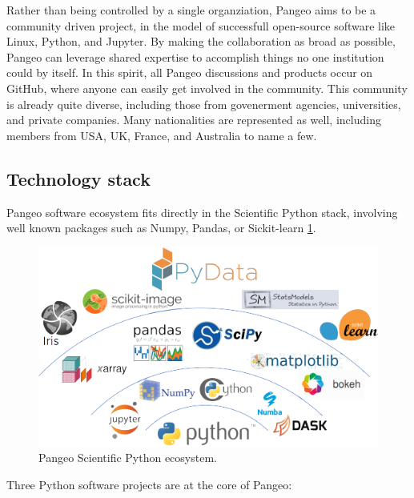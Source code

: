 \documentclass{article}
\begin{document}
Rather than being controlled by a single organziation, Pangeo aims to be a community driven project, in the model of successfull open-source software like Linux, Python, and Jupyter. By making the collaboration as broad as possible, Pangeo can leverage shared expertise to accomplish things no one institution could by itself. In this spirit, all Pangeo discussions and products occur on GitHub\cite{b3}, where anyone can easily get involved in the community.
This community is already quite diverse, including those from govenerment agencies, universities, and private companies. Many nationalities are represented as well, including members from USA, UK, France, and Australia to name a few.


\subsection{Technology stack}
\label{ssec:techstack}

Pangeo software ecosystem fits directly in the Scientific Python stack, involving well known packages such as Numpy, Pandas, or Sickit-learn \ref{scipy_stack}.

\begin{figure}
  \centering
  \includegraphics[width=\columnwidth]{pangeo_python_stack.png}
  \caption{\label{scipy_stack} Pangeo Scientific Python ecosystem.}
\end{figure}

Three Python software projects are at the core of Pangeo:
\end{document}
